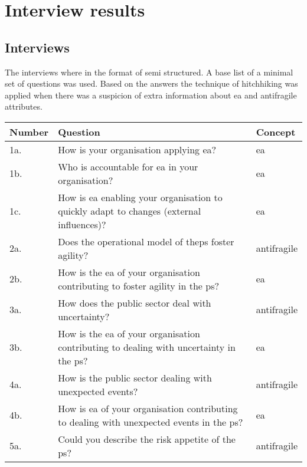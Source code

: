 \chapter{Interview results}
\label{ch:interviewresults}

\section{Interviews}
\label{sec:interviews}
The interviews where in the format of semi structured. A base list of a minimal set of questions was used. Based on the answers the technique of hitchhiking was applied when there was a suspicion of extra information about \acrshort{ea} and \gls{antifragile} attributes.

\begin{table}[!h]
	\label{tab:interviewquestions}
	\begin{center}
			\begin{tabular}{@{}p{}p{}p{}@{}}
				\toprule
				\textbf{Number} & \textbf{Question} & \textbf{Concept} \\ \midrule %
				1a. & How is your organisation applying \acrshort{ea}? & \acrshort{ea} \\%
				1b. & Who is accountable for \acrshort{ea} in your organisation? & \acrshort{ea} \\%
				1c. & How is \acrshort{ea} enabling your organisation to quickly adapt to changes (external influences)? & \acrshort{ea} \\%
				2a. & Does the operational model of the\gls{ps} \gls{foster} \gls{agility}? & \Gls{antifragile} \\%
				2b. & How is the \acrshort{ea} of your organisation contributing to \gls{foster} \gls{agility} in the \gls{ps}? & \acrshort{ea} \\%
				3a. & How does the public sector deal with \gls{uncertainty}? & \Gls{antifragile} \\%
				3b. & How is the \acrshort{ea} of your organisation contributing to dealing with \gls{uncertainty} in the \gls{ps}?
				 & \acrshort{ea} \\%
				4a. & How is the public sector dealing with unexpected events? & \Gls{antifragile} \\%
				4b. & How is \acrshort{ea} of your organisation contributing to dealing with unexpected events in the \gls{ps}? & \acrshort{ea} \\%
				5a. & Could you describe the risk appetite of the \gls{ps}? & \Gls{antifragile} \\%

\end{tabular}
\end{center}
\end{table}
